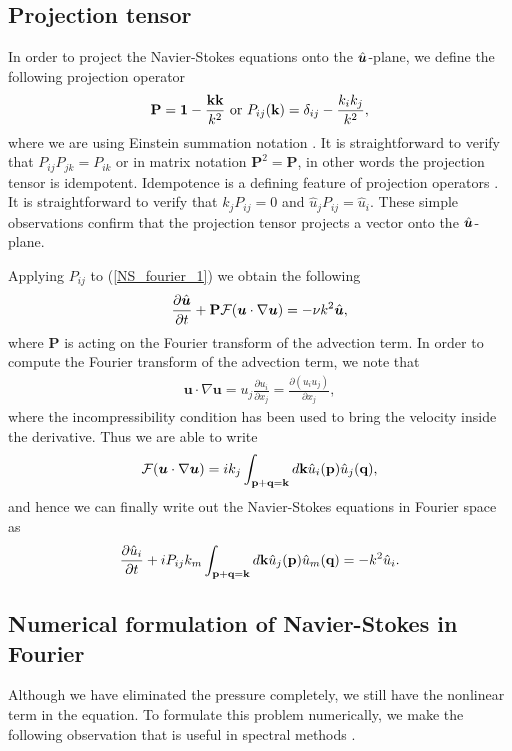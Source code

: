 \subsection{Projection tensor}
In order to project the Navier-Stokes equations onto the $\hat{\bm{u}}$-plane, we define the following projection operator
\begin{align}
\textbf{P}=\textbf{1} - \frac{\textbf{k}\textbf{k}}{k^{2}} \text{ or } P_{ij}(\textbf{k}) = \delta_{ij} - \frac{k_{i}k_{j}}{k^{2}},
\end{align}
where we are using Einstein summation notation \cite{lesieur,wald}. It is straightforward to verify that $P_{ij}P_{jk}=P_{ik}$ or in matrix notation $\textbf{P}^{2}=\textbf{P}$, in other words the projection tensor is idempotent. Idempotence is a defining feature of projection operators \cite{MeyerLinAlg}. It is straightforward to verify that $k_{j}P_{ij}=0$ and $\hat{u}_{j}P_{ij}=\hat{u}_{i}$. These simple observations confirm that the projection tensor projects a vector onto the $\hat{\bm{u}}$-plane. 

Applying $P_{ij}$ to (\ref{NS_fourier_1}) we obtain the following 
\begin{align}
\frac{\partial \hat{\bm{u}}}{\partial t} + \textbf{P}\mathcal{F}(\bm{u}\cdot\nabla\bm{u}) =  -\nu k^{2}\hat{\bm{u}}\label{NS_fourier_3},
\end{align}
where $\textbf{P}$ is acting on the Fourier transform of the advection term. In order to compute the Fourier transform of the advection term, we note that 
\begin{align}
\bm{u}\cdot\nabla\bm{u} = u_{j}\frac{\partial u_{i}}{\partial x_{j}} = \frac{\partial (u_{i}u_{j})}{\partial x_{j}},
\end{align}
where the incompressibility condition has been used to bring the velocity inside the derivative. Thus we are able to write
\begin{align}
\mathcal{F}(\bm{u}\cdot\nabla\bm{u})=ik_{j}\int_{\textbf{p}+\textbf{q}=\textbf{k}}d\textbf{k}\hat{u}_{i}(\textbf{p})\hat{u}_{j}(\textbf{q}),
\end{align}
and hence we can finally write out the Navier-Stokes equations in Fourier space as \cite{lesieur}
\begin{align}
\frac{\partial \hat{u}_{i}}{\partial t} + iP_{ij}k_{m}\int_{\textbf{p}+\textbf{q}=\textbf{k}}d\textbf{k}\hat{u}_{j}(\textbf{p})\hat{u}_{m}(\textbf{q})=  -k^{2}\hat{u}_{i}\label{NS_fourier_4}.
\end{align}

\subsection{Numerical formulation of Navier-Stokes in Fourier}
Although we have eliminated the pressure completely, we still have the nonlinear term in the equation. To formulate this problem numerically, we make the following observation that is useful in spectral methods \cite{lesieur,orszag1972}.

